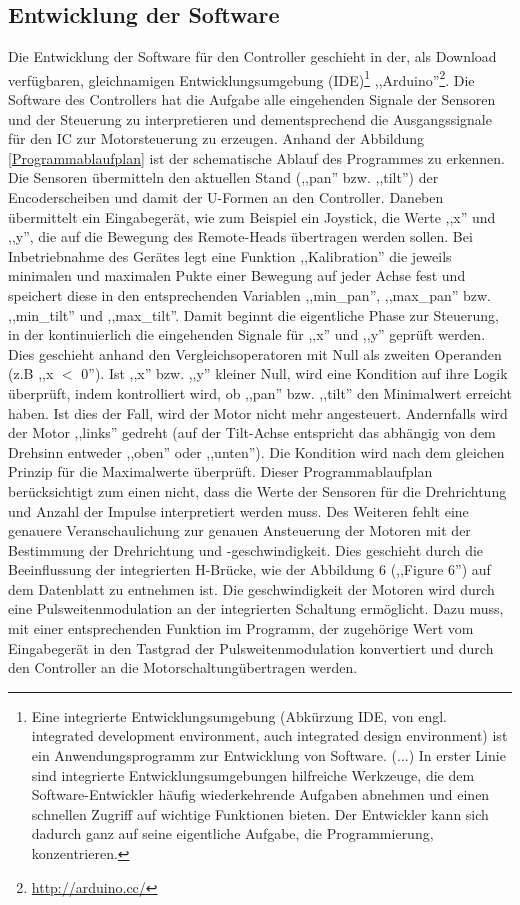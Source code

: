 \documentclass[a4paper, 12pt, bibtotocnumbered, liststotocnumbered]{scrartcl}
\begin{document}
	\subsection{Entwicklung der Software}
	Die Entwicklung der Software für den Controller geschieht in der, als Download verfügbaren, gleichnamigen Entwicklungsumgebung (IDE)\footnote{Eine integrierte Entwicklungsumgebung (Abkürzung IDE, von engl. integrated development environment, auch integrated design environment) ist ein Anwendungsprogramm zur Entwicklung von Software. (...) In erster Linie sind integrierte Entwicklungsumgebungen hilfreiche Werkzeuge, die dem Software-Entwickler häufig wiederkehrende Aufgaben abnehmen und einen schnellen Zugriff auf wichtige Funktionen bieten. Der Entwickler kann sich dadurch ganz auf seine eigentliche Aufgabe, die Programmierung, konzentrieren.} ,,Arduino”\footnote{\url{http://arduino.cc/}}.
	Die Software des Controllers hat die Aufgabe alle eingehenden Signale der Sensoren und der Steuerung zu interpretieren und dementsprechend die Ausgangssignale für den IC zur Motorsteuerung zu erzeugen.
	Anhand der Abbildung \ref{Programmablaufplan} ist der schematische Ablauf des Programmes zu erkennen. Die Sensoren übermitteln den aktuellen Stand (,,pan'' bzw. ,,tilt'') der Encoderscheiben und damit der U-Formen an den Controller. Daneben übermittelt ein Eingabegerät, wie zum Beispiel ein Joystick, die Werte ,,x'' und ,,y'', die auf die Bewegung des Remote-Heads übertragen werden sollen. Bei Inbetriebnahme des Gerätes legt eine Funktion ,,Kalibration'' die jeweils minimalen und maximalen Pukte einer Bewegung auf jeder Achse fest und speichert diese in den entsprechenden Variablen ,,min\_pan'', ,,max\_pan'' bzw. ,,min\_tilt'' und ,,max\_tilt''. Damit beginnt die eigentliche Phase zur Steuerung, in der kontinuierlich die eingehenden Signale für ,,x'' und ,,y'' geprüft werden. Dies geschieht anhand den Vergleichsoperatoren mit Null als zweiten Operanden (z.B ,,x $<$ 0''). Ist ,,x'' bzw. ,,y'' kleiner Null, wird eine Kondition auf ihre Logik überprüft, indem kontrolliert wird, ob ,,pan'' bzw. ,,tilt'' den Minimalwert erreicht haben. Ist dies der Fall, wird der Motor nicht mehr angesteuert. Andernfalls wird der Motor ,,links'' gedreht (auf der Tilt-Achse entspricht das abhängig von dem Drehsinn entweder ,,oben'' oder ,,unten''). Die Kondition wird nach dem gleichen Prinzip für die Maximalwerte überprüft.
	Dieser Programmablaufplan berücksichtigt zum einen nicht, dass die Werte der Sensoren für die Drehrichtung und Anzahl der Impulse interpretiert werden muss. Des Weiteren fehlt eine genauere Veranschaulichung zur genauen Ansteuerung der Motoren mit der Bestimmung der Drehrichtung und -geschwindigkeit. Dies geschieht durch die Beeinflussung der integrierten H-Brücke, wie der Abbildung 6 (,,Figure 6'') auf dem Datenblatt \cite{l298} zu entnehmen ist. Die geschwindigkeit der Motoren wird durch eine Pulsweitenmodulation an der integrierten Schaltung ermöglicht. Dazu muss, mit einer entsprechenden Funktion im Programm, der zugehörige Wert vom Eingabegerät in den Tastgrad\cite{wikipedia-tastgrad} der Pulsweitenmodulation konvertiert und durch den Controller an die Motorschaltungübertragen werden. 
\end{document}
